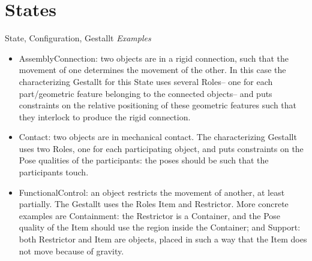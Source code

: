 \section{States}
\begin{ODP}{State, Configuration, Gestallt}
\emph{Examples}
\begin{itemize}
  \item AssemblyConnection: two objects are in a rigid connection, such that the movement of one determines the movement of the other. In this case the characterizing Gestallt for this State uses several Roles-- one for each part/geometric feature belonging to the connected objects-- and puts constraints on the relative positioning of these geometric features such that they interlock to produce the rigid connection.
  \item Contact: two objects are in mechanical contact. The characterizing Gestallt uses two Roles, one for each participating object, and puts constraints on the Pose qualities of the participants: the poses should be such that the participants touch.
  \item FunctionalControl: an object restricts the movement of another, at least partially. The Gestallt uses the Roles Item and Restrictor. More concrete examples are Containment: the Restrictor is a Container, and the Pose quality of the Item should use the region inside the Container; and Support: both Restrictor and Item are objects, placed in such a way that the Item does not move because of gravity.

\end{itemize}
\end{ODP}
